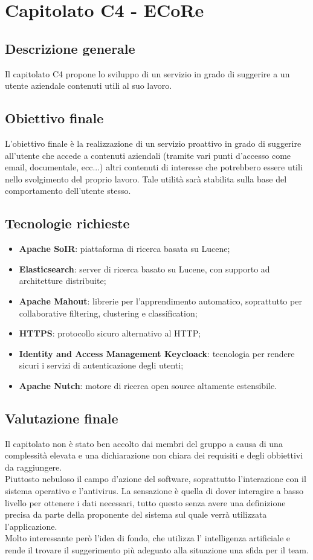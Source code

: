 \documentclass[StudioDiFattibilità.tex]{subfiles}
\begin{document}
\chapter{Capitolato C4 - ECoRe}
\section{Descrizione generale}
Il capitolato C4 propone lo sviluppo di un servizio in grado di suggerire a un utente aziendale contenuti utili al suo lavoro.
\section{Obiettivo finale}
L'obiettivo finale è la realizzazione di un servizio proattivo in grado di suggerire all'utente che accede a contenuti aziendali (tramite vari punti d'accesso come email, documentale, ecc...) altri contenuti di interesse che potrebbero essere utili nello svolgimento del proprio lavoro. Tale utilità sarà stabilita sulla base del comportamento dell'utente stesso.
\section{Tecnologie richieste}
\begin{itemize}
	\item \textbf{Apache SoIR}: piattaforma di ricerca basata su Lucene;
	\item \textbf{Elasticsearch}: server di ricerca basato su Lucene, con supporto ad architetture distribuite;
	\item \textbf{Apache Mahout}: librerie per l'apprendimento automatico, soprattutto per collaborative filtering, clustering e classification;
	\item \textbf{HTTPS}: protocollo sicuro alternativo al HTTP;
	\item \textbf{Identity and Access Management Keycloack}: tecnologia per rendere sicuri i servizi di autenticazione degli utenti;
	\item \textbf{Apache Nutch}: motore di ricerca open source altamente estensibile.
\end{itemize}
\section{Valutazione finale}
Il capitolato non è stato ben accolto dai membri del gruppo a causa di una complessità elevata e una dichiarazione non chiara dei requisiti e degli obbiettivi da raggiungere.\\ Piuttosto nebuloso il campo d'azione del software, soprattutto l'interazione con il sistema operativo e l'antivirus. La sensazione è quella di dover interagire a basso livello per ottenere i dati necessari, tutto questo senza avere una definizione precisa da parte della proponente del sistema sul quale verrà utilizzata l'applicazione.\\
Molto interessante però l'idea di fondo, che utilizza l' intelligenza artificiale e rende il trovare il suggerimento più adeguato alla situazione una sfida per il team.
\end{document}
